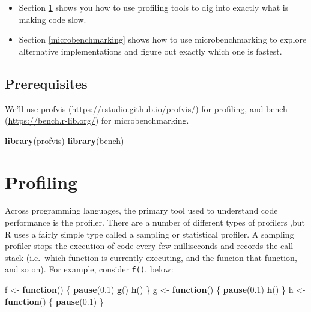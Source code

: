 \documentclass[]{book}
\makeatletter
\newenvironment{Shaded}{\begin{snugshade}}{\end{snugshade}}
\newcommand{\ControlFlowTok}[1]{\textcolor[rgb]{0.27,0.27,0.27}{\textbf{#1}}}
\newcommand{\FloatTok}[1]{\textcolor[rgb]{0.06,0.06,0.06}{#1}}
\newcommand{\KeywordTok}[1]{\textcolor[rgb]{0.27,0.27,0.27}{\textbf{#1}}}
\newcommand{\NormalTok}[1]{#1}
\newcommand{\StringTok}[1]{\textcolor[rgb]{0.5,0.5,0.5}{#1}}
\newcommand{\indexc}[1]{\index{#1@\texttt{#1}}}
\renewcommand{\href}[2]{#2 (\url{#1})}
\makeatother
\begin{document}
\begin{itemize}
\item
  Section \ref{profiling} shows you how to use profiling tools to dig into
  exactly what is making code slow.
\item
  Section \ref{microbenchmarking} shows how to use microbenchmarking to
  explore alternative implementations and figure out exactly which one is
  fastest.
\end{itemize}

\hypertarget{prerequisites-5}{%
\subsection*{Prerequisites}\label{prerequisites-5}}

We'll use \href{https://rstudio.github.io/profvis/}{profvis} for profiling, and \href{https://bench.r-lib.org/}{bench} for microbenchmarking.

\begin{Shaded}
\begin{Highlighting}[]
\KeywordTok{library}\NormalTok{(profvis)}
\KeywordTok{library}\NormalTok{(bench)}
\end{Highlighting}
\end{Shaded}

\hypertarget{profiling}{%
\section{Profiling}\label{profiling}}

\indexc{RProf()}

Across programming languages, the primary tool used to understand code performance is the profiler. There are a number of different types of profilers ,but R uses a fairly simple type called a sampling or statistical profiler. A sampling profiler stops the execution of code every few milliseconds and records the call stack (i.e.~which function is currently executing, and the funcion that function, and so on). For example, consider \texttt{f()}, below:

\begin{Shaded}
\begin{Highlighting}[]
\NormalTok{f <-}\StringTok{ }\ControlFlowTok{function}\NormalTok{() \{}
  \KeywordTok{pause}\NormalTok{(}\FloatTok{0.1}\NormalTok{)}
  \KeywordTok{g}\NormalTok{()}
  \KeywordTok{h}\NormalTok{()}
\NormalTok{\}}
\NormalTok{g <-}\StringTok{ }\ControlFlowTok{function}\NormalTok{() \{}
  \KeywordTok{pause}\NormalTok{(}\FloatTok{0.1}\NormalTok{)}
  \KeywordTok{h}\NormalTok{()}
\NormalTok{\}}
\NormalTok{h <-}\StringTok{ }\ControlFlowTok{function}\NormalTok{() \{}
  \KeywordTok{pause}\NormalTok{(}\FloatTok{0.1}\NormalTok{)}
\NormalTok{\}}
\end{Highlighting}
\end{Shaded}
\end{document}
